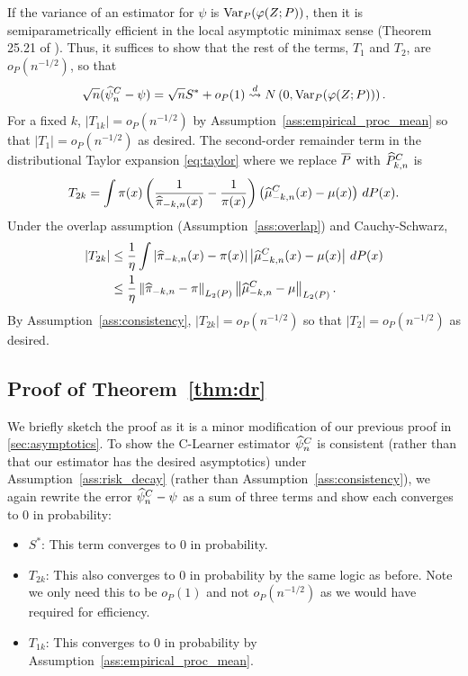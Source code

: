 If the variance of an estimator for $\psi$ is ${\rm Var}_P(\varphi(Z;P))$, then it is semiparametrically efficient in the local asymptotic minimax sense (Theorem 25.21 of \cite{van2000asymptotic}). 
Thus,  it suffices to show that the rest of the terms, $T_1$ and $T_2$, are $o_P(n^{-1/2})$, so that
$$
\sqrt{n}(\widehat{\psi}^C_n - \psi)=\sqrt{n} S^*+o_P(1)\stackrel{d}{\rightsquigarrow} {N}\left(0, {\rm Var}_P (\varphi(Z;P))\right)
.$$
For a fixed $k$,
$|T_{1k}|=o_P(n^{-1/2})$ 
by Assumption~\ref{ass:empirical_proc_mean}
so that $|T_1|=o_P(n^{-1/2})$ as desired. 
The second-order remainder term in the distributional Taylor expansion \eqref{eq:taylor} where
we replace $\overline{P}$ with $\widehat{P}^C_{k,n}$
is
$$
T_{2k} = \int \pi(x) \left( \frac{1}{\widehat{\pi}_{-k,n}(x)} - \frac{1}{\pi(x)} \right) \left( \widehat{\mu}^C_{-k,n}(x) - \mu(x) \right) \, dP(x)
.$$
Under the overlap assumption (Assumption~\ref{ass:overlap}) and  Cauchy-Schwarz, 
\begin{align}
    |T_{2k}| &\leq \frac{1}{\eta} \int \left| \widehat{\pi}_{-k,n}(x) - \pi(x) \right| \left| \widehat{\mu}^C_{-k,n}(x) - \mu(x) \right| \, dP(x) \nonumber \\
    &\leq \frac{1}{\eta} \left\|\widehat{\pi}_{-k,n} -\pi\right\|_{L_2(P)} \left\|\widehat{\mu}^C_{-k,n} - \mu\right\|_{L_2(P)}. \label{eq:T2_cauchy_schwarz}
\end{align}
By Assumption~\ref{ass:consistency},
$|T_{2k}|=o_P(n^{-1/2})$
so that 
$|T_{2}|=o_P(n^{-1/2})$ as desired. 





\subsection{Proof of Theorem~\ref{thm:dr}}
\label{sec:double_robustness}
We briefly sketch the proof as it is a minor modification of our previous proof in \cref{sec:asymptotics}.  To show the C-Learner estimator 
$\widehat{\psi}^C_n$ 
is consistent (rather than that our estimator has the desired asymptotics) under Assumption~\ref{ass:risk_decay} (rather than Assumption~\ref{ass:consistency}), we  again rewrite the error $\widehat{\psi}_n^C-\psi$ as a sum of three terms and show  each converges to 0 in probability: 
\begin{itemize}
    \item $S^*$: This term converges to 0 in probability. 
    \item $T_{2k}$: This also converges to 0 in probability by the same logic as before. Note we only need this to be $o_P(1)$ and not $o_P(n^{-1/2})$ as we would have required for efficiency. 
    \item $T_{1k}$: This converges to 0 in probability by Assumption~\ref{ass:empirical_proc_mean}. 
\end{itemize}

